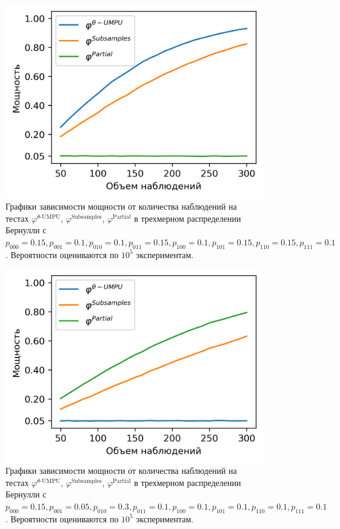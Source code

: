 \begin{figure}[H]
    \centering
    \includegraphics[scale=0.8]{images/graph4.png}
    \caption{Графики зависимости мощности от количества наблюдений
    на тестах $\varphi^{\text{$\theta$-UMPU}}$, $\varphi^{\text{Subsamples}}$, $\varphi^{\text{Partial}}$
    в трехмерном распределении Бернулли с $p_{000}=0.15, p_{001}=0.1, 
    p_{010}=0.1, p_{011}=0.15,
    p_{100}=0.1, p_{101}=0.15, p_{110}=0.15, p_{111}=0.1$. Вероятности оцениваются по $10^5$ экспериментам.} \label{fig:4}
\end{figure}

\begin{figure}[H]
    \centering
    \includegraphics[scale=0.8]{images/graph5.png}
    \caption{Графики зависимости мощности от количества наблюдений
    на тестах $\varphi^{\text{$\theta$-UMPU}}$, $\varphi^{\text{Subsamples}}$, $\varphi^{\text{Partial}}$
    в трехмерном распределении Бернулли с $p_{000}=0.15, p_{001}=0.05, 
    p_{010}=0.3, p_{011}=0.1,
    p_{100}=0.1, p_{101}=0.1, p_{110}=0.1, p_{111}=0.1$. Вероятности оцениваются по $10^5$ экспериментам.} \label{fig:5}
\end{figure}

